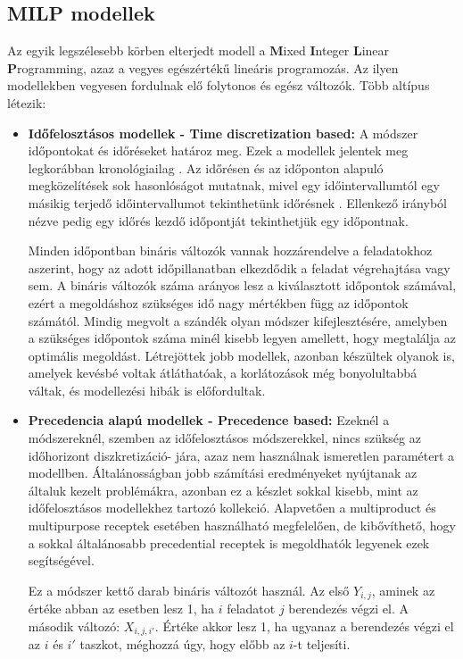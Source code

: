 \subsection{MILP modellek}
Az egyik legszélesebb körben elterjedt modell a \textbf{M}ixed \textbf{I}nteger \textbf{L}inear \textbf{P}rogramming, azaz a vegyes egészértékű lineáris programozás. Az ilyen modellekben vegyesen fordulnak elő folytonos és egész változók. Több altípus létezik:
\begin{itemize}
  \item[] \textbf{Időfelosztásos modellek - Time discretization based:} A módszer időpontokat és időréseket határoz meg. Ezek a modellek jelentek meg legkorábban kronológiailag \cite{kondili}. Az időrésen és az időponton alapuló megközelítések sok hasonlóságot mutatnak, mivel egy időintervallumtól egy másikig terjedő időintervallumot tekinthetünk időrésnek \cite{susarla}. Ellenkező irányból nézve pedig egy időrés kezdő időpontját tekinthetjük egy időpontnak.  
  
Minden időpontban bináris változók vannak hozzárendelve a feladatokhoz aszerint, hogy az adott időpillanatban elkezdődik a feladat végrehajtása vagy sem. A bináris változók száma arányos lesz a kiválasztott időpontok számával, ezért a megoldáshoz szükséges idő nagy mértékben függ az időpontok számától. Mindig megvolt a szándék olyan módszer kifejlesztésére, amelyben a szükséges időpontok száma minél kisebb legyen amellett, hogy megtalálja az optimális megoldást. Létrejöttek jobb modellek, azonban készültek olyanok is, amelyek kevésbé voltak átláthatóak, a korlátozások még bonyolultabbá váltak, és modellezési hibák is előfordultak.
  
  \item[] \textbf{Precedencia alapú modellek - Precedence based:} Ezeknél a módszereknél, szemben az időfelosztásos módszerekkel, nincs szükség az időhorizont diszkretizáció- jára, azaz nem használnak ismeretlen paramétert a modellben. Általánosságban jobb számítási eredményeket nyújtanak az általuk kezelt problémákra, azonban ez a készlet sokkal kisebb, mint az időfelosztásos modellekhez tartozó kollekció. Alapvetően a multiproduct és multipurpose receptek esetében használható megfelelően, de kibővíthető, hogy a sokkal általánosabb precedential receptek is megoldhatók legyenek ezek segítségével. 
  
Ez a módszer kettő darab bináris változót használ. Az első $Y_{i,j}$, aminek az értéke abban az esetben lesz 1, ha $i$ feladatot $j$ berendezés végzi el. A második változó: $X_{i,j,i'}$. Értéke akkor lesz 1, ha ugyanaz a berendezés végzi el az $i$ és $i'$ taszkot, méghozzá úgy, hogy előbb az $i$-t teljesíti. 
\end{itemize}

